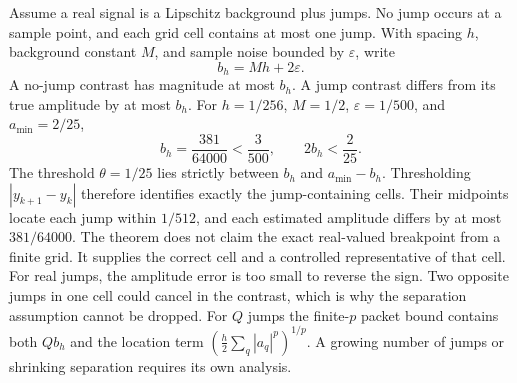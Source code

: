 Assume a real signal is a Lipschitz background plus jumps. No jump occurs at a sample point, and each grid cell contains at most one jump. With spacing $h$, background constant $M$, and sample noise bounded by $\varepsilon$, write
\[
b_h=Mh+2\varepsilon.
\]
A no-jump contrast has magnitude at most $b_h$. A jump contrast differs from its true amplitude by at most $b_h$.
For $h=1/256$, $M=1/2$, $\varepsilon=1/500$, and $a_{\min}=2/25$,
\[
b_h=\frac{381}{64000}<\frac3{500},\qquad
2b_h<\frac2{25}.
\]
The threshold $\theta=1/25$ lies strictly between $b_h$ and $a_{\min}-b_h$. Thresholding $|y_{k+1}-y_k|$ therefore identifies exactly the jump-containing cells. Their midpoints locate each jump within $1/512$, and each estimated amplitude differs by at most $381/64000$.
The theorem does not claim the exact real-valued breakpoint from a finite grid. It supplies the correct cell and a controlled representative of that cell. For real jumps, the amplitude error is too small to reverse the sign. Two opposite jumps in one cell could cancel in the contrast, which is why the separation assumption cannot be dropped.
For $Q$ jumps the finite-$p$ packet bound contains both $Qb_h$ and the location term $(\tfrac h2\sum_q|a_q|^p)^{1/p}$. A growing number of jumps or shrinking separation requires its own analysis.

